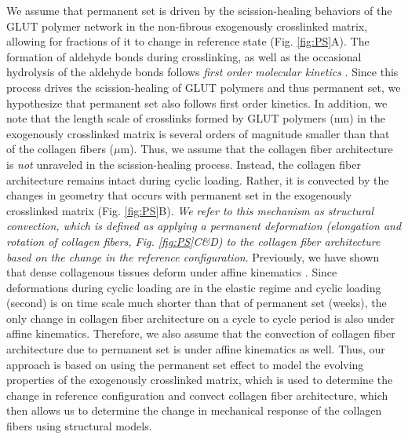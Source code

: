 	We assume that permanent set is driven by the scission-healing behaviors of the GLUT polymer network in the non-fibrous exogenously crosslinked matrix, allowing for fractions of it to change in reference state (Fig. \ref{fig:PS}A). 
	The formation of aldehyde bonds during crosslinking, as well as the occasional hydrolysis of the aldehyde bonds follows \emph{first order molecular kinetics} \cite{migneault_glutaraldehyde_2004}. 
	Since this process drives the scission-healing of GLUT polymers and thus permanent set, we hypothesize that permanent set also follows first order kinetics. 
	In addition, we note that the length scale of crosslinks formed by GLUT polymers ($\mathrm{nm}$) in the exogenously crosslinked matrix is several orders of magnitude smaller than that of the collagen fibers ($\mu \mathrm{m}$). 
	Thus, we assume that the collagen fiber architecture is \emph{not} unraveled in the scission-healing process. 
	Instead, the collagen fiber architecture remains intact during cyclic loading. 
	Rather, it is convected by the changes in geometry that occurs with permanent set in the exogenously crosslinked matrix (Fig. \ref{fig:PS}B).
	\emph{We refer to this mechanism as structural convection, which is defined as applying a permanent deformation (elongation and rotation of collagen fibers, Fig. \ref{fig:PS}C\&D) to the collagen fiber architecture based on the change in the reference configuration}. 
	Previously, we have shown that dense collagenous tissues deform under affine kinematics \cite{lee_presence_2015}. 
	Since deformations during cyclic loading are in the elastic regime and cyclic loading (second) is on time scale much shorter than that of permanent set (weeks), the only change in collagen fiber architecture on a cycle to cycle period is also under affine kinematics. 
	Therefore, we also assume that the convection of collagen fiber architecture due to permanent set is under affine kinematics as well. 
	Thus, our approach is based on using the permanent set effect to model the evolving properties of the exogenously crosslinked matrix, which is used to determine the change in reference configuration and convect collagen fiber architecture, which then allows us to determine the change in mechanical response of the collagen fibers using structural models. 

